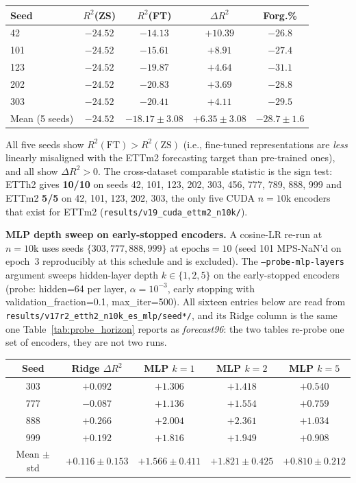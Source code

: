 \begin{center}
\small
\begin{tabular}{lcccc}
\toprule
Seed & $R^2$(ZS) & $R^2$(FT) & $\Delta R^2$ & Forg.\% \\
\midrule
42  & $-24.52$ & $-14.13$ & $+10.39$ & $-26.8$ \\
101 & $-24.52$ & $-15.61$ & $+8.91$  & $-27.4$ \\
123 & $-24.52$ & $-19.87$ & $+4.64$  & $-31.1$ \\
202 & $-24.52$ & $-20.83$ & $+3.69$  & $-28.8$ \\
303 & $-24.52$ & $-20.41$ & $+4.11$  & $-29.5$ \\
\midrule
Mean (5 seeds) & $-24.52$ & $-18.17{\pm}3.08$ & $+6.35{\pm}3.08$ & $-28.7{\pm}1.6$ \\
\bottomrule
\end{tabular}
\end{center}

All five seeds show $R^2(\text{FT}) > R^2(\text{ZS})$ (i.e., fine-tuned
representations are \emph{less} linearly misaligned with the ETTm2
forecasting target than pre-trained ones), and all show $\Delta R^2{>}0$.
The cross-dataset comparable statistic is the sign test: ETTh2 gives
\textbf{10/10} on seeds 42, 101, 123, 202, 303, 456, 777, 789, 888, 999 and
ETTm2 \textbf{5/5} on 42, 101, 123, 202, 303, the only five CUDA $n{=}10$k
encoders that exist for ETTm2 (\texttt{results/v19\_cuda\_ettm2\_n10k/}).

\textbf{MLP depth sweep on early-stopped encoders.}
A cosine-LR re-run at $n{=}10$k uses seeds
$\{303, 777, 888, 999\}$ at $\mathrm{epochs}{=}10$ (seed 101
MPS-NaN'd on epoch~3 reproducibly at this schedule and is excluded).
The \texttt{--probe-mlp-layers}
argument sweeps hidden-layer depth $k \in \{1, 2, 5\}$ on the
early-stopped encoders (probe: hidden=64 per layer, $\alpha{=}10^{-3}$,
early stopping with validation\_fraction=0.1, max\_iter=500).  All sixteen
entries below are read from
\texttt{results/v17r2\_etth2\_n10k\_es\_mlp/seed*/}, and its Ridge column is the
same one Table~\ref{tab:probe_horizon} reports as \emph{forecast96}: the two
tables re-probe one set of encoders, they are not two runs.

\begin{center}
\begin{tabular}{c c c c c}
\toprule
Seed & Ridge $\Delta R^2$ & MLP $k{=}1$ & MLP $k{=}2$ & MLP $k{=}5$ \\
\midrule
303 & $+0.092$ & $+1.306$ & $+1.418$ & $+0.540$ \\
777 & $-0.087$ & $+1.136$ & $+1.554$ & $+0.759$ \\
888 & $+0.266$ & $+2.004$ & $+2.361$ & $+1.034$ \\
999 & $+0.192$ & $+1.816$ & $+1.949$ & $+0.908$ \\
\midrule
Mean $\pm$ std & $+0.116{\pm}0.153$ & $+1.566{\pm}0.411$ & $+1.821{\pm}0.425$ & $+0.810{\pm}0.212$ \\
\bottomrule
\end{tabular}
\end{center}

